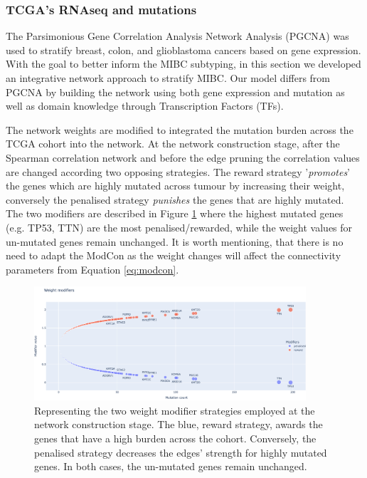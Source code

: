 \subsubsection{TCGA's RNAseq and mutations}


The Parsimonious Gene Correlation Analysis Network Analysis (PGCNA) was used to stratify breast, colon, and glioblastoma cancers \cite{Care2019-ij,Tanner2023-wa} based on gene expression. With the goal to better inform the MIBC subtyping, in this section we developed an integrative network approach to stratify MIBC. Our model differs from PGCNA by building the network using both gene expression and mutation as well as  domain knowledge through Transcription Factors (TFs).

The network weights are modified to integrated the mutation burden across the TCGA cohort into the network. At the network construction stage, after the Spearman correlation network and before the edge pruning the correlation values are changed according two opposing strategies. The reward strategy '\textit{promotes}' the genes which are highly mutated across tumour by increasing their weight, conversely the penalised strategy \textit{punishes} the genes that are highly mutated. The two modifiers are described in Figure \ref{fig:N_I:modifiers} where the highest mutated genes (e.g. TP53, TTN) are the most penalised/rewarded, while the weight values for un-mutated genes remain unchanged. It is worth mentioning, that there is no need to adapt the ModCon as the weight changes will affect the connectivity parameters from Equation \ref{eq:modcon}.

\begin{figure}[!htb]    \centering\includegraphics[width=0.9\textwidth,height=0.9\textheight,keepaspectratio]{Sections/Network_I/Resources/Methods/modifiers.png}
    \caption{Representing the two weight modifier strategies employed at the network construction stage. The blue, reward strategy, awards the genes that have a high burden across the cohort. Conversely, the  penalised strategy decreases the edges' strength for highly mutated genes. In both cases, the un-mutated genes remain unchanged.}
    \label{fig:N_I:modifiers}
\end{figure}


